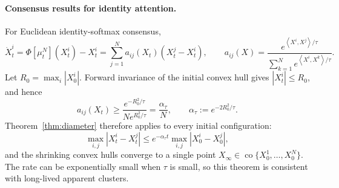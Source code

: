 \documentclass[11pt]{amsart}
\numberwithin{equation}{section}
\theoremstyle{plain}
\newcommand{\ip}[2]{\left\langle#1,#2\right\rangle}
\begin{document}
\paragraph{\textbf{Consensus results for identity attention.}}
 For Euclidean identity-softmax consensus,
\begin{equation}\label{eq:identity-softmax-consensus}
 \dot X_t^i=\Phi[\mu_t^N](X_t^i)-X_t^i
 =\sum_{j=1}^Na_{ij}(X_t)(X_t^j-X_t^i),
 \qquad
 a_{ij}(X)=\frac{e^{\ip{X^i}{X^j}/\tau}}
 {\sum_{k=1}^Ne^{\ip{X^i}{X^k}/\tau}}.
\end{equation}
Let $R_0=\max_i|X_0^i|$.  Forward invariance of the initial convex hull gives
$|X_t^i|\leq R_0$, and hence
\[
 a_{ij}(X_t)
 \geq\frac{e^{-R_0^2/\tau}}{Ne^{R_0^2/\tau}}
 =\frac{\alpha_\tau}{N},
 \qquad \alpha_\tau:=e^{-2R_0^2/\tau}.
\]
Theorem~\ref{thm:diameter} therefore applies to every initial configuration:
\[
 \max_{i,j}|X_t^i-X_t^j|
 \leq e^{-\alpha_\tau t}
 \max_{i,j}|X_0^i-X_0^j|,
\]
and the shrinking convex hulls converge to a single point
$X_\infty\in\operatorname{co}\{X_0^1,\ldots,X_0^N\}$.  The rate can be
exponentially small when $\tau$ is small, so this theorem is consistent with
long-lived apparent clusters.
\end{document}
